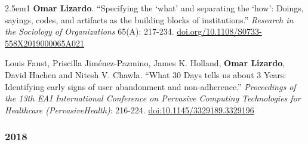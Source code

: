 \documentclass[
]{article}
\newenvironment{cventry}{\begin{hangparas}{2.5em}{1}}{\end{hangparas}}
\begin{document}
\begin{cventry}
\textbf{Omar Lizardo}. ``Specifying the `what' and separating the `how':
Doings, sayings, codes, and artifacts as the building blocks of
institutions.'' \emph{Research in the Sociology of Organizations} 65(A):
217-234.
\href{https://doi.org/10.1108/S0733-558X2019000065A021}{doi.org/10.1108/S0733-558X2019000065A021}

Louis Faust, Priscilla Jiménez-Pazmino, James K. Holland, \textbf{Omar
Lizardo}, David Hachen and Nitesh V. Chawla. ``What 30 Days tells us
about 3 Years: Identifying early signs of user abandonment and
non-adherence.'' \emph{Proceedings of the 13th EAI International
Conference on Pervasive Computing Technologies for Healthcare
(PervasiveHealth)}: 216-224.
\href{https://doi.org/10.1145/3329189.3329196}{doi:10.1145/3329189.3329196}

\end{cventry}

\subsubsection{2018}\label{section-4}
\end{document}
